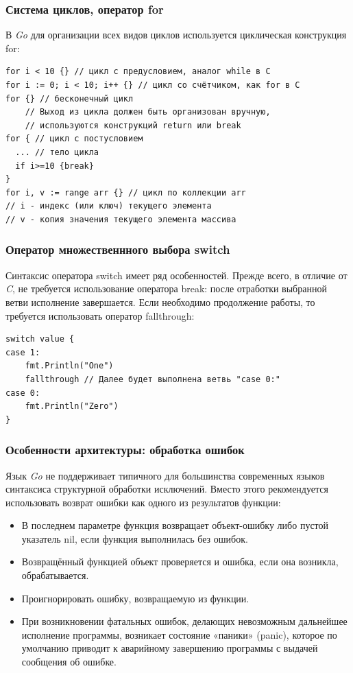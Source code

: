 \documentclass[11pt]{beamer}
\begin{document}
\begin{frame}[fragile]
\frametitle{Система циклов, оператор for}
В \textit{Go} для организации всех видов циклов используется циклическая конструкция {\color{blue}for}:
\begin{verbatim}
for i < 10 {} // цикл с предусловием, аналог while в С
for i := 0; i < 10; i++ {} // цикл со счётчиком, как for в С
for {} // бесконечный цикл
    // Выход из цикла должен быть организован вручную,
    // используются конструкций return или break
for { // цикл с постусловием
  ... // тело цикла
  if i>=10 {break}
}
for i, v := range arr {} // цикл по коллекции arr
// i - индекс (или ключ) текущего элемента
// v - копия значения текущего элемента массива
\end{verbatim}
\end{frame}
\begin{frame}[fragile]
\frametitle{Оператор множественнного выбора switch}
Синтаксис оператора {\color{blue}switch} имеет ряд особенностей. Прежде всего, в отличие от \textit{C}, не требуется использование оператора {\color{blue}break}: после отработки выбранной ветви исполнение завершается. Если необходимо продолжение работы, то требуется использовать оператор {\color{blue}fallthrough}:
\begin{verbatim}
switch value {
case 1:
    fmt.Println("One")
    fallthrough // Далее будет выполнена ветвь "case 0:"
case 0:
    fmt.Println("Zero")
}
\end{verbatim}
\end{frame}
\begin{frame}
\frametitle{Особенности архитектуры: обработка ошибок}
Язык \textit{Go} не поддерживает типичного для большинства современных языков синтаксиса структурной обработки исключений. Вместо этого рекомендуется использовать возврат ошибки как одного из результатов функции:
\begin{itemize} 
    \item В последнем параметре функция возвращает объект-ошибку либо пустой указатель {\color{yellow}nil}, если функция выполнилась без ошибок.
    \item Возвращённый функцией объект проверяется и ошибка, если она возникла, обрабатывается.
    \item Проигнорировать ошибку, возвращаемую из функции.
    \item При возникновении фатальных ошибок, делающих невозможным дальнейшее исполнение программы, возникает состояние {\color{yellow}«паники» (panic)}, которое по умолчанию приводит к аварийному завершению программы с выдачей сообщения об ошибке.
\end{itemize}
\end{frame}
\end{document}
